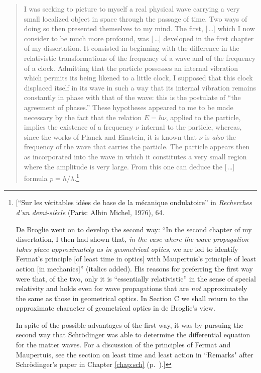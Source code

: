 \begin{quotation}
I was seeking to picture to myself a real physical wave carrying a very
small localized object in space through the passage of time. Two ways of
doing so then presented themselves to my mind. The first, [\,\ldots] which I
now consider to be much more profound, was [\,\ldots] developed in the first
chapter of my dissertation. It consisted in beginning with the
difference in the relativistic transformations of the frequency of a
wave and of the frequency of a clock. Admitting that the particle
possesses an internal vibration which permits its being likened to a
little clock, I supposed that this clock displaced itself in its wave in
such a way that its internal vibration remains constantly in phase with
that of the wave: this is the postulate of ``the agreement of phases.''
These hypotheses appeared to me to be made necessary by the fact that
the relation $E = h\nu$, applied to the particle, implies the
existence of a frequency $\nu$ internal to the particle, whereas,
since the works of Planck and Einstein, it is known that $\nu$ is
\emph{also} the frequency of the wave that carries the particle. The
particle appears then as incorporated into the wave in which it
constitutes a very small region where the amplitude is very large. From
this one can deduce the [\,\ldots] formula $p =h/\lambda$.\footnote{{[}``Sur 
  les véritables idées de base de la
  mécanique ondulatoire'' in \emph{Recherches d'un demi-siècle} (Paris:
  Albin Michel, 1976), 64.

  \label{fn:deb_approx} De Broglie went on to develop the second way: ``In the second chapter
  of my dissertation, I then had shown that, \emph{in the case where the
  wave propagation takes place approximately as in geometrical optics},
  we are led to identify Fermat's principle {[}of least time in
  optics{]} with Maupertuis's principle of least action {[}in
  mechanics{]}'' (italics added). His reasons for preferring the first
  way were that, of the two, only it is ``essentially relativistic'' in
  the sense of special relativity and holds even for wave propagations
  that are \emph{not} approximately the same as those in geometrical
  optics. In Section C we shall return to the approximate character of
  geometrical optics in de Broglie's view.

  In spite of the possible advantages of the first way, it was by
  pursuing the second way that Schrödinger was able to determine the
  differential equation for the matter waves. For a discussion of the
  principles of Fermat and Maupertuis, see the section on least time and least action
  in ``Remarks" after Schrödinger's paper in Chapter \ref{chap:sch} (p.~\pageref{sec:sch_least}).{]}}
\end{quotation}

